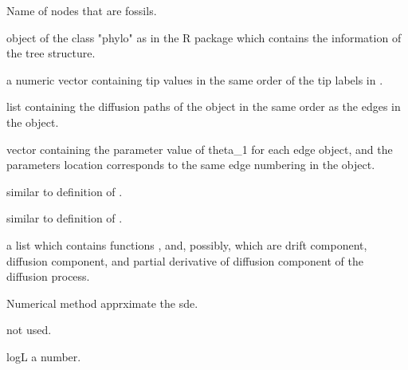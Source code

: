 \documentclass[letterpaper]{book}
\begin{document}
\begin{Arguments}
\begin{ldescription}
\item[\code{fossils}] Name of nodes that are fossils.
\item[\code{tr}] object of the class "phylo" as in the  R package which
contains the information of the tree structure.

\item[\code{tipdata}] a numeric vector containing tip values in the
same order of the tip labels in .

\item[\code{lst}] list containing the diffusion paths of the  object in the same
order as the edges in the  object.

\item[\code{alpha}] vector containing the parameter value of theta\_1 for each edge  object,
and the parameters location corresponds to the same edge numbering in the  object.

\item[\code{mu}] similar to definition of .

\item[\code{sigma}] similar to definition of .

\item[\code{model}] a list which contains functions ,  and, possibly,  which are drift component, diffusion component, and partial derivative of diffusion component of the diffusion process.


\item[\code{method}] Numerical method apprximate the sde.

\item[\code{...}] not used.
\end{ldescription}
\end{Arguments}
%
\begin{Value}
logL a number.
\end{Value}
%
\end{document}
